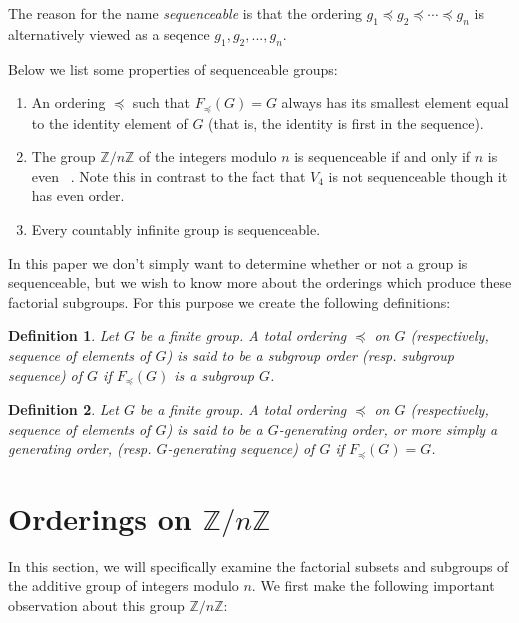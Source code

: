 \documentclass{article}
\newtheorem{definition}{Definition}
\begin{document}
The reason for the name \textit{sequenceable} is that the ordering $g_1\preceq g_2\preceq\cdots\preceq g_n$ is alternatively viewed as a seqence $g_1,g_2,...,g_n$. 

Below we list some properties of sequenceable groups:

\begin{enumerate}
\item An ordering $\preceq$ such that $F_\preceq(G) = G$ always has its smallest element equal to the identity element of $G$ (that is, the identity is first in the sequence).
\item The group $\mathbb{Z}/n\mathbb{Z}$ of the integers modulo $n$ is sequenceable if and only if $n$ is even ~\cite{Gor}. Note this in contrast to the fact that $V_4$ is not sequenceable though it has even order.
\item Every countably infinite group is sequenceable. ~\cite{Van}

\end{enumerate}



In this paper we don't simply want to determine whether or not a group is sequenceable, but we wish to know more about the orderings which produce these factorial subgroups. For this purpose we create the following definitions:

\begin{definition} Let $G$ be a finite group. A total ordering $\preceq$ on $G$ (respectively, sequence of elements of $G$) is said to be a subgroup order (resp. subgroup sequence) of $G$ if $F_\preceq(G)$ is a subgroup $G$. 
\end{definition}

\begin{definition} Let $G$ be a finite group. A total ordering $\preceq$ on $G$ (respectively, sequence of elements of $G$) is said to be a $G$-generating order, or more simply a generating order, (resp. $G$-generating sequence) of $G$ if $F_\preceq(G)=G$. 
\end{definition}




\section{Orderings on $\mathbb{Z}/n\mathbb{Z}$}


In this section, we will specifically examine the factorial subsets and subgroups of the additive group of integers modulo $n$. We first make the following important observation about this group $\mathbb{Z}/n\mathbb{Z}$:
\end{document}
